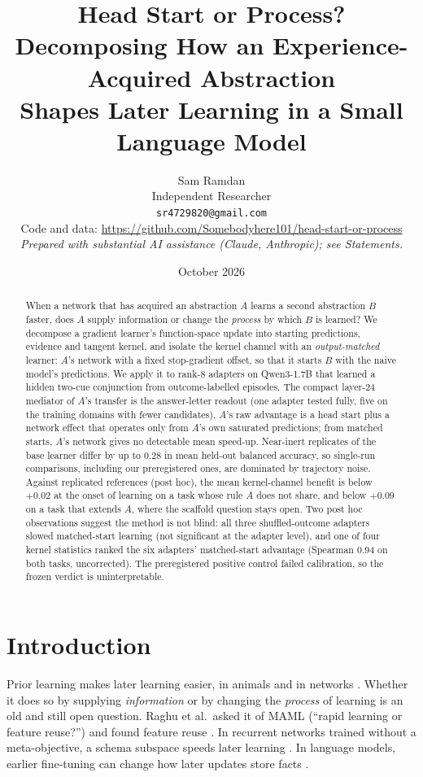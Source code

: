 \documentclass[11pt]{article}
\title{Head Start or Process?\\ Decomposing How an Experience-Acquired Abstraction\\ Shapes Later Learning in a Small Language Model}
\author{
  Sam Ramdan\\
  Independent Researcher\\
  \texttt{sr4729820@gmail.com}\\[4pt]
  {\small Code and data: \url{https://github.com/Somebodyhere101/head-start-or-process}}\\
  {\small\itshape Prepared with substantial AI assistance (Claude, Anthropic); see Statements.}
}
\date{October 2026}
\begin{document}
\maketitle

\begin{abstract}
When a network that has acquired an abstraction $A$ learns a second abstraction $B$ faster, does $A$ supply information or change the \emph{process} by which $B$ is learned? We decompose a gradient learner's function-space update into starting predictions, evidence and tangent kernel, and isolate the kernel channel with an \emph{output-matched} learner: $A$'s network with a fixed stop-gradient offset, so that it starts $B$ with the naive model's predictions. We apply it to rank-8 adapters on Qwen3-1.7B that learned a hidden two-cue conjunction from outcome-labelled episodes. The compact layer-24 mediator of $A$'s transfer is the answer-letter readout (one adapter tested fully, five on the training domains with fewer candidates). $A$'s raw advantage is a head start plus a network effect that operates only from $A$'s own saturated predictions; from matched starts, $A$'s network gives no detectable mean speed-up. Near-inert replicates of the base learner differ by up to 0.28 in mean held-out balanced accuracy, so single-run comparisons, including our preregistered ones, are dominated by trajectory noise. Against replicated references (post hoc), the mean kernel-channel benefit is below $+0.02$ at the onset of learning on a task whose rule $A$ does not share, and below $+0.09$ on a task that extends $A$, where the scaffold question stays open. Two post hoc observations suggest the method is not blind: all three shuffled-outcome adapters slowed matched-start learning (not significant at the adapter level), and one of four kernel statistics ranked the six adapters' matched-start advantage (Spearman 0.94 on both tasks, uncorrected). The preregistered positive control failed calibration, so the frozen verdict is uninterpretable.
\end{abstract}

\section{Introduction}

Prior learning makes later learning easier, in animals \citep{harlow1949,tse2007} and in networks \citep{raghu2020,goudar2023}. Whether it does so by supplying \emph{information} or by changing the \emph{process} of learning is an old and still open question. Raghu et al.\ asked it of MAML (``rapid learning or feature reuse?'') and found feature reuse \citep{raghu2020}. In recurrent networks trained without a meta-objective, a schema subspace speeds later learning \citep{goudar2023}. In language models, earlier fine-tuning can change how later updates store facts \citep{krasheninnikov2024}.
\end{document}
